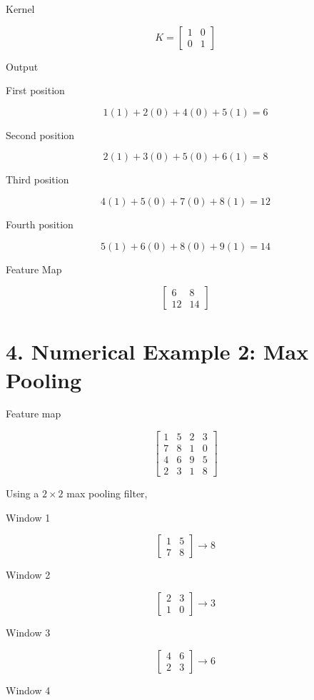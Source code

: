 \documentclass[11pt]{article}
\begin{document}
Kernel

\[
K=
\begin{bmatrix}
1&0\\
0&1
\end{bmatrix}
\]

Output

First position

\[
1(1)+2(0)+4(0)+5(1)=6
\]

Second position

\[
2(1)+3(0)+5(0)+6(1)=8
\]

Third position

\[
4(1)+5(0)+7(0)+8(1)=12
\]

Fourth position

\[
5(1)+6(0)+8(0)+9(1)=14
\]

Feature Map

\[
\begin{bmatrix}
6&8\\
12&14
\end{bmatrix}
\]

\section*{4. Numerical Example 2: Max Pooling}

Feature map

\[
\begin{bmatrix}
1&5&2&3\\
7&8&1&0\\
4&6&9&5\\
2&3&1&8
\end{bmatrix}
\]

Using a $2\times2$ max pooling filter,

Window 1

\[
\begin{bmatrix}
1&5\\
7&8
\end{bmatrix}
\rightarrow 8
\]

Window 2

\[
\begin{bmatrix}
2&3\\
1&0
\end{bmatrix}
\rightarrow3
\]

Window 3

\[
\begin{bmatrix}
4&6\\
2&3
\end{bmatrix}
\rightarrow6
\]

Window 4
\end{document}
